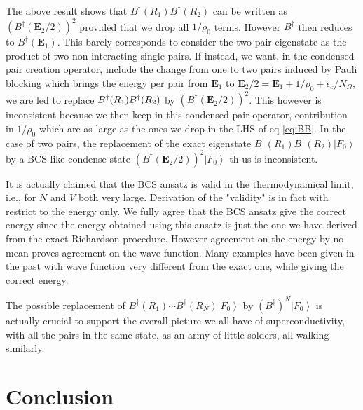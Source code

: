 \documentclass[aps,prb,superscriptaddress,twocolumn]{revtex4}
\begin{document}
The above result shows that $B^{\dagger}(R_1)B^{\dagger}(R_2)$ can be
written as $\left(B^{\dagger}(\mathbf{E} _2/2)\right) ^2$ provided that we
drop all $1/\rho_0$ terms. However $B^{\dagger}$ then reduces to $%
B^{\dagger}(\mathbf{E} _1)$. This barely corresponds to consider the
two-pair eigenstate as the product of two non-interacting single pairs. If
instead, we want, in the condensed pair creation operator, include the
change from one to two pairs induced by Pauli blocking which brings the
energy per pair from $\mathbf{E} _1$ to $\mathbf{E} _2/2=\mathbf{E}
_1+1/\rho_0+\epsilon_c/N_\Omega$, we are led to replace $B^{\dagger}(R_1)B^{%
\dagger}(R_2)$ by $\left(B^{\dagger}(\mathbf{E} _2/2)\right) ^2$. This
however is inconsistent because we then keep in this condensed pair
operator, contribution in $1/\rho_0$ which are as large as the ones we drop
in the LHS of eq \eqref{eq:BB}. In the case of two pairs, the replacement of
the exact eigenstate $B^{\dagger}(R_1)B^{\dagger}(R_2)\left|F_0\right>  $ by
a BCS-like condense state $\left(B^{\dagger}(\mathbf{E} _2/2)\right)
^2\left|F_0\right>  $ th  us is inconsistent.

It is actually claimed that the BCS ansatz is valid in the thermodynamical
limit, i.e., for $N$ and $V$ both very large. Derivation of the "validity"
is in fact with restrict to the energy only. We fully agree that the BCS
ansatz give the correct energy since the energy obtained using this ansatz
is just the one we have derived from the exact Richardson procedure. However
agreement on the energy by no mean proves agreement on the wave function.
Many examples have been given in the past with wave function very different
from the exact one, while giving the correct energy.

The possible replacement of $B^{\dagger}(R_1)\cdots{}B^{\dagger}(R_N)%
\left|F_0\right>  $ by $\left(B^{\dagger}\right) ^N\left|F_0\right>  $ is
actually crucial to support the overall picture we all have of
superconductivity, with all the pairs in the same state, as an army of
little solders, all walking similarly.

\section{Conclusion}
\end{document}
